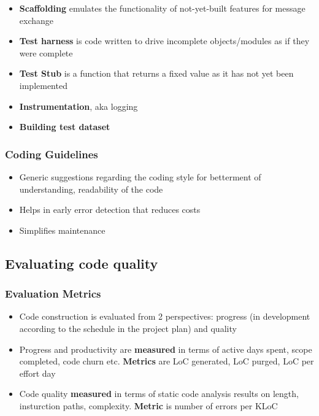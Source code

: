 \documentclass{article}
\begin{document}
\begin{itemize}
\begin{itemize}
        \item \textbf{Scaffolding} emulates the functionality of not-yet-built features for message exchange
        
        \item \textbf{Test harness} is code written to drive incomplete objects/modules as if they were complete
        
        \item \textbf{Test Stub} is a function that returns a fixed value as it has not yet been implemented
        
        \item \textbf{Instrumentation}, aka logging 
        
        \item \textbf{Building test dataset}
    \end{itemize}
 \end{itemize}
 
 \subsubsection{Coding Guidelines}
 \begin{itemize}
     \item Generic suggestions regarding the coding style for betterment of understanding, readability of the code
     
     \item Helps in early error detection that reduces costs
     
     \item Simplifies maintenance
 \end{itemize}
 
 \subsection{Evaluating code quality}
 \subsubsection{Evaluation Metrics}
 \begin{itemize}
     \item Code construction is evaluated from 2 perspectives: progress (in development according to the schedule in the project plan) and quality 
     
     \item Progress and productivity are \textbf{measured} in terms of active days spent, scope completed, code churn etc. \textbf{Metrics} are LoC generated, LoC purged, LoC per effort day
     
     \item Code quality \textbf{measured} in terms of static code analysis results on length, insturction paths, complexity. \textbf{Metric} is number of errors per KLoC
 \end{itemize}
 
\end{document}
